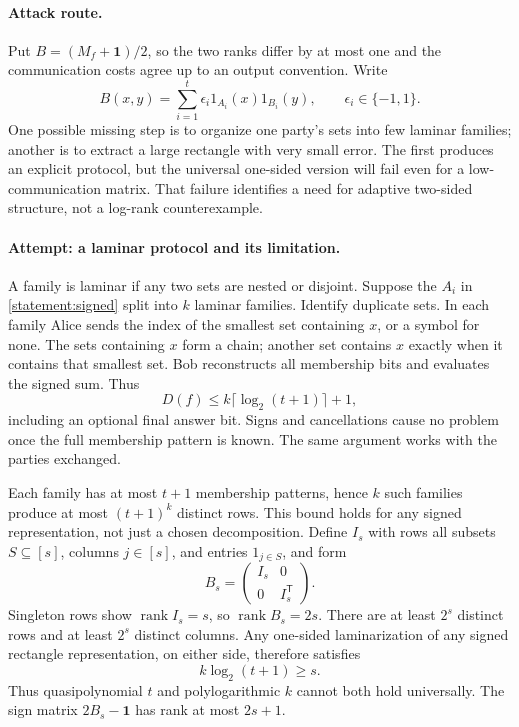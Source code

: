 \documentclass[11pt,a4paper]{article}
\numberwithin{equation}{section}
\begin{document}
\paragraph{Attack route.}
Put $B=(M_f+\mathbf1)/2$, so the two ranks differ by at most one and the
communication costs agree up to an output convention. Write
\begin{equation}\label{statement:signed}
 B(x,y)=\sum_{i=1}^t\epsilon_i1_{A_i}(x)1_{B_i}(y),
 \qquad\epsilon_i\in\{-1,1\}.
\end{equation}
One possible missing step is to organize one party's sets into few laminar
families; another is to extract a large rectangle with very small error.
The first produces an explicit protocol, but the universal one-sided version
will fail even for a low-communication matrix. That failure identifies a
need for adaptive two-sided structure, not a log-rank counterexample.

\paragraph{Attempt: a laminar protocol and its limitation.}
A family is laminar if any two sets are nested or disjoint. Suppose the
$A_i$ in \eqref{statement:signed} split into $k$ laminar families. Identify duplicate
sets. In each family Alice sends the index of the smallest set containing
$x$, or a symbol for none. The sets containing $x$ form a chain; another
set contains $x$ exactly when it contains that smallest set. Bob reconstructs
all membership bits and evaluates the signed sum. Thus
\begin{equation}\label{statement:protocol}
 D(f)\le k\lceil\log_2(t+1)\rceil+1,
\end{equation}
including an optional final answer bit. Signs and cancellations cause no
problem once the full membership pattern is known. The same argument works
with the parties exchanged.

Each family has at most $t+1$ membership patterns, hence $k$ such families
produce at most $(t+1)^k$ distinct rows. This bound holds for any signed
representation, not just a chosen decomposition. Define $I_s$ with rows
all subsets $S\subseteq[s]$, columns $j\in[s]$, and entries $1_{j\in S}$,
and form
\[
 B_s=\begin{pmatrix}I_s&0\\0&I_s^{\mathsf T}\end{pmatrix}.
\]
Singleton rows show $\operatorname{rank}I_s=s$, so
$\operatorname{rank}B_s=2s$. There are at least $2^s$ distinct rows and at
least $2^s$ distinct columns. Any one-sided laminarization of any signed
rectangle representation, on either side, therefore satisfies
\begin{equation}\label{statement:obstruction}
 k\log_2(t+1)\ge s.
\end{equation}
Thus quasipolynomial $t$ and polylogarithmic $k$ cannot both hold universally.
The sign matrix $2B_s-\mathbf1$ has rank at most $2s+1$.
\end{document}
